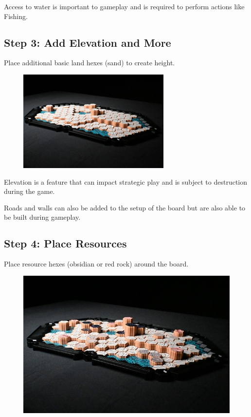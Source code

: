 \documentclass[../main.tex]{subfiles}
\begin{document}
Access to water is important to gameplay and is required to perform actions like Fishing.

\clearpage
\subsection{Step 3: Add Elevation and More}
Place additional basic land hexes (sand) to create height.

\begin{figure}[h]
    \centering
    \includegraphics[width=1\linewidth]{chapters//boardsetup/sandplacement.png}
\end{figure}

Elevation is a feature that can impact strategic play and is subject to destruction during the game.

Roads and walls can also be added to the setup of the board but are also able to be built during gameplay.

\subsection{Step 4:  Place Resources}
Place resource hexes (obsidian or red rock) around the board.

\begin{figure}[h]
    \centering
    \includegraphics[width=1\linewidth]{chapters//boardsetup/TimeStrikePlaceResources.jpg}
\end{figure}
\end{document}
